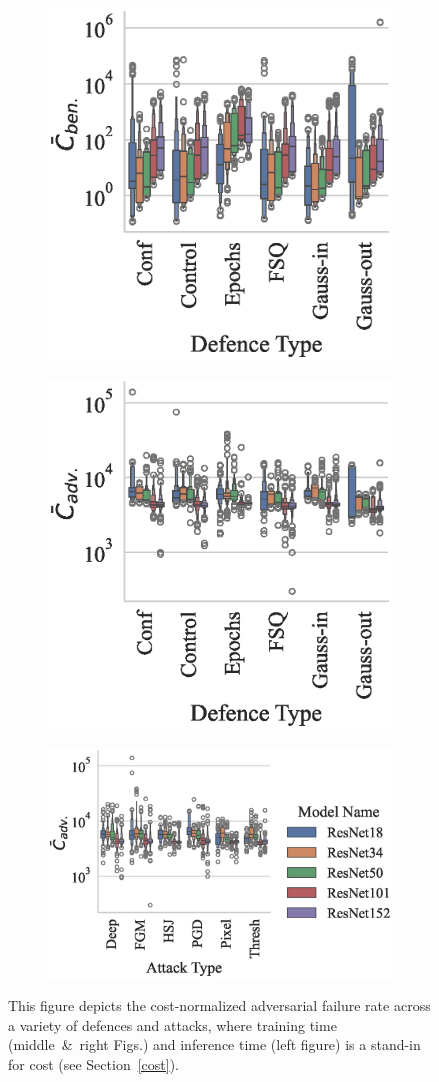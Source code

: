 \begin{figure}[!h]
    \centering
    \begin{subfigure}
        \centering
        \includegraphics[width=.28\textwidth]{mnist/ben_failures_per_train_time_vs_defence_type.eps}
    \end{subfigure}
    \begin{subfigure}
        \centering
        \includegraphics[width=.28\textwidth]{mnist/adv_failures_per_train_time_vs_defence_type.eps}
    \end{subfigure}
    \begin{subfigure}
        \centering
        \includegraphics[width=.41\textwidth]{mnist/adv_failures_per_train_time_vs_attack_type.eps}
    \end{subfigure}
    \caption{This figure depicts the cost-normalized adversarial failure rate across a variety of defences and attacks, where training time (middle~\&~right Figs.) and inference time (left figure) is a stand-in for cost (see Section~\ref{cost}).}
    \label{fig:mnist_failures_per_train_time}
\end{figure}

